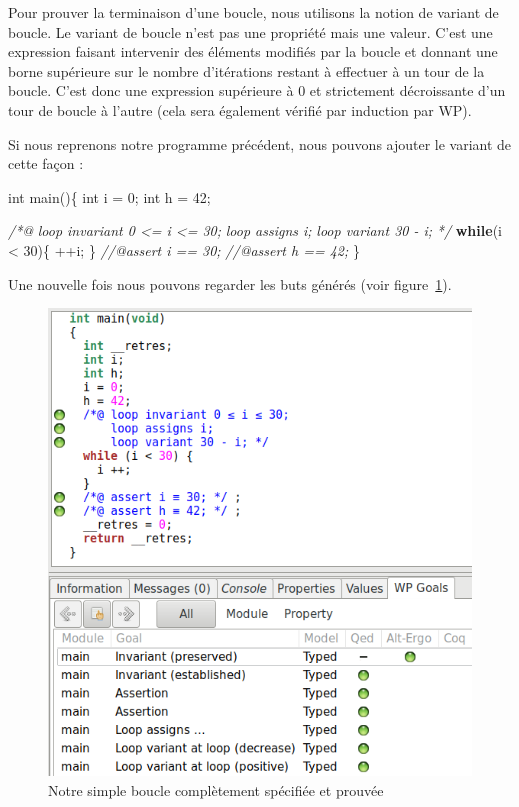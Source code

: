 \documentclass[12pt,francais,]{scrbook}
\newenvironment{Shaded}{}{}
\newcommand{\KeywordTok}[1]{\textcolor[rgb]{0.00,0.44,0.13}{\textbf{{#1}}}}
\newcommand{\DataTypeTok}[1]{\textcolor[rgb]{0.56,0.13,0.00}{{#1}}}
\newcommand{\DecValTok}[1]{\textcolor[rgb]{0.25,0.63,0.44}{{#1}}}
\newcommand{\CommentTok}[1]{\textcolor[rgb]{0.38,0.63,0.69}{\textit{{#1}}}}
\newcommand{\NormalTok}[1]{{#1}}
\begin{document}
Pour prouver la terminaison d'une boucle, nous utilisons la notion de
variant de boucle. Le variant de boucle n'est pas une propriété mais une
valeur. C'est une expression faisant intervenir des éléments modifiés
par la boucle et donnant une borne supérieure sur le nombre d'itérations
restant à effectuer à un tour de la boucle. C'est donc une expression
supérieure à 0 et strictement décroissante d'un tour de boucle à l'autre
(cela sera également vérifié par induction par WP).

Si nous reprenons notre programme précédent, nous pouvons ajouter le
variant de cette façon :

\begin{footnotesize}\begin{Shaded}
\begin{Highlighting}[]
\DataTypeTok{int} \NormalTok{main()\{}
  \DataTypeTok{int} \NormalTok{i = }\DecValTok{0}\NormalTok{;}
  \DataTypeTok{int} \NormalTok{h = }\DecValTok{42}\NormalTok{;}
  
  \CommentTok{/*@}
\CommentTok{    loop invariant 0 <= i <= 30;}
\CommentTok{    loop assigns i;}
\CommentTok{    loop variant 30 - i;}
\CommentTok{  */}
  \KeywordTok{while}\NormalTok{(i < }\DecValTok{30}\NormalTok{)\{}
    \NormalTok{++i;}
  \NormalTok{\}}
  \CommentTok{//@assert i == 30;}
  \CommentTok{//@assert h == 42;}
\NormalTok{\}}
\end{Highlighting}
\end{Shaded}\end{footnotesize}

Une nouvelle fois nous pouvons regarder les buts générés (voir
figure~\ref{fig:3-3-loop-ok}).

\begin{figure}[htbp]
\centering
\includegraphics[scale=0.5]{3-3-boucle_complete.png}
\caption{Notre simple boucle complètement spécifiée et prouvée}
\label{fig:3-3-loop-ok}
\end{figure}
\end{document}
